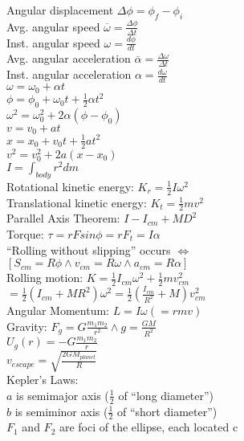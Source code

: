 \documentclass{minimal}
\begin{document}
\begin{multicols}{2}
\noindent 
Angular displacement $\Delta \phi = \phi_f - \phi_i$\\
Avg. angular speed $\overline{\omega} = \frac{\Delta \phi}{\Delta t}$\\
Inst. angular speed $\omega = \frac{d \phi}{d t}$\\
Avg. angular acceleration $\overline{\alpha} = \frac{\Delta \omega}{\Delta t}$\\
Inst. angular acceleration $\alpha = \frac{d \omega}{d t}$\\
\(\omega = \omega_0 + \alpha t\)\\
\(\phi = \phi_0 + \omega_0 t + \frac{1}{2}\alpha t^2\)\\
\(\omega^2 = \omega_{0}^2 + 2\alpha(\phi - \phi_0)\)\\
\(v = v_0 + at\)\\
\(x = x_0 + v_0 t + \frac{1}{2}a t^2\)\\
\(v^2 = v_{0}^2 + 2a(x - x_0)\)\\
\(I = \int_{body}{}r^2 dm\)\\
Rotational kinetic energy: \(K_r = \frac{1}{2}I\omega^2\)\\
Translational kinetic energy: \(K_t = \frac{1}{2}mv^2\)\\
Parallel Axis Theorem: \(I - I_{cm} + MD^2\)\\
Torque: \(\tau = rFsin\phi = rF_t = I\alpha\)\\
``Rolling without slipping'' occurs \(\iff\)\\
\([ S_{cm} = R\phi \land v_{cm} = R\omega \land a_{cm} = R\alpha ]\)\\
Rolling motion: \(K = \frac{1}{2}I_{cm}\omega^2 + \frac{1}{2}mv_{cm}^2\)\\
\(= \frac{1}{2}(I_{cm} + MR^2)\omega^2 = \frac{1}{2}(\frac{I_{cm}}{R^2} + M)v_{cm}^2\)\\
Angular Momentum: \(L = I\omega (= rmv)\)\\
Gravity: \(F_g = G\frac{m_1 m_2}{r^2} \land g = \frac{GM}{R^2}\)\\
\(U_{g}(r) = -G\frac{m_1 m_2}{r}\)\\
\(v_{escape} = \sqrt{\frac{2GM_{planet}}{R}}\)\\
Kepler's Laws:\\
$a$ is semimajor axis ($\frac{1}{2}$ of ``long diameter'')\\
$b$ is semiminor axis ($\frac{1}{2}$ of ``short diameter'')\\
$F_1$ and $F_2$ are foci of the ellipse, each located c\\

\end{multicols}
\end{document}
